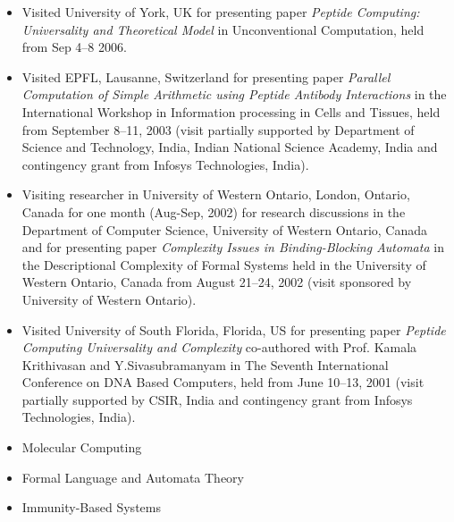 \documentclass[11pt]{article}
\begin{document}
\vspace{0.1cm}


\vspace{0.1cm}

\begin{itemize}
\item Visited University of York, UK for presenting paper {\it Peptide
  Computing: Universality and Theoretical Model} in Unconventional
  Computation, held from Sep 4--8 2006.
\item Visited EPFL, Lausanne, Switzerland for presenting paper {\it
Parallel Computation of Simple Arithmetic using Peptide Antibody
Interactions} in the International Workshop in Information processing
in Cells and Tissues, held from September 8--11, 2003 (visit partially
supported by Department of Science and Technology, India, Indian
National Science Academy, India and contingency grant from Infosys
Technologies, India).
\item Visiting researcher in University of Western Ontario, London,
Ontario, Canada for one month (Aug-Sep, 2002) for research discussions
in the Department of Computer Science, University of Western Ontario,
Canada and for presenting paper {\it Complexity Issues in
Binding-Blocking Automata} in the Descriptional Complexity of Formal
Systems held in the University of Western Ontario, Canada from August
21--24, 2002 (visit sponsored by University of Western Ontario).
\item Visited University of South Florida, Florida, US for presenting
paper {\it Peptide Computing Universality and Complexity} co-authored
with Prof. Kamala Krithivasan and Y.Sivasubramanyam in The Seventh
International Conference on DNA Based Computers, held from June
10--13, 2001 (visit partially supported by CSIR, India and contingency
grant from Infosys Technologies, India).
\end{itemize}


\begin{itemize}
\item Molecular Computing
\item Formal Language and Automata Theory
\item Immunity-Based Systems
\end{itemize}

\vspace{0.3cm}
\end{document}
